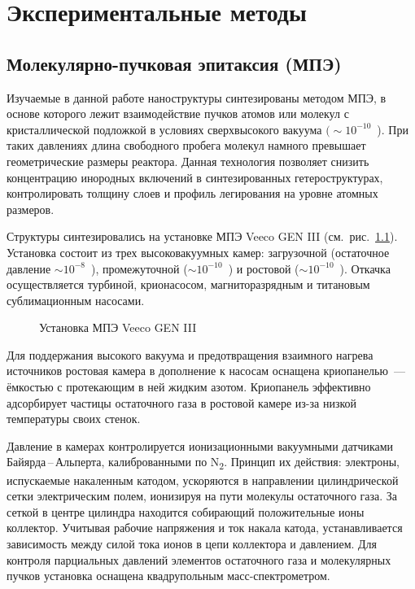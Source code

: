 \chapter{Экспериментальные методы}\label{ch:ch2}

\section{Молекулярно-пучковая эпитаксия (МПЭ)}\label{sec:ch2/sec1}

Изучаемые в данной работе наноструктуры синтезированы методом МПЭ, в основе которого лежит взаимодействие пучков атомов или молекул с кристаллической подложкой в условиях сверхвысокого вакуума \((\sim 10^{-10}\)~\si{\torr}). При таких давлениях длина свободного пробега молекул намного превышает геометрические размеры реактора. Данная технология позволяет снизить концентрацию инородных включений в синтезированных гетероструктурах, контролировать толщину слоев и профиль легирования на уровне атомных размеров.

Структуры синтезировались на установке МПЭ Veeco GEN III (см.~рис.~\cref{fig:Image_10}). Установка состоит из трех высоковакуумных камер: загрузочной (остаточное давление \(\sim 10^{-8}\)~\si{\torr}), промежуточной (\(\sim 10^{-10}\)~\si{\torr}) и ростовой (\(\sim 10^{-10}\)~\si{\torr}). Откачка осуществляется турбиной, крионасосом, магниторазрядным и титановым сублимационным насосами.

\begin{figure}[ht]
	\caption{Установка МПЭ Veeco GEN III}\label{fig:Image_10}
\end{figure}

Для поддержания высокого вакуума и предотвращения взаимного нагрева источников ростовая камера в дополнение к насосам оснащена криопанелью~--- ёмкостью с протекающим в ней жидким азотом. Криопанель эффективно адсорбирует частицы остаточного газа в ростовой камере из-за низкой температуры своих стенок.

Давление в камерах контролируется ионизационными вакуумными датчиками Байярда\,--\,Альперта, калиброванными по N\textsubscript{2}. Принцип их действия: электроны, испускаемые накаленным катодом, ускоряются в направлении цилиндрической сетки электрическим полем, ионизируя на пути молекулы остаточного газа. За сеткой в центре цилиндра находится собирающий положительные ионы коллектор. Учитывая рабочие напряжения и ток накала катода, устанавливается зависимость между силой тока ионов в цепи коллектора и давлением. Для контроля парциальных давлений элементов остаточного газа и молекулярных пучков установка оснащена квадрупольным масс-спектрометром.

